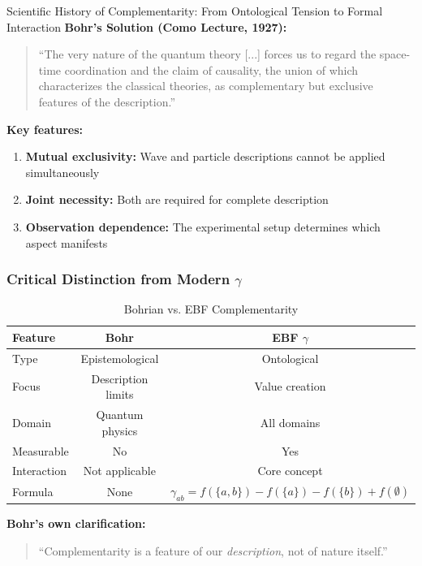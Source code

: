 \begin{chapter}{Scientific History of Complementarity: From Ontological Tension to Formal Interaction}
\textbf{Bohr's Solution (Como Lecture, 1927):}

\begin{quote}
``The very nature of the quantum theory [...] forces us to regard the space-time coordination and the claim of causality, the union of which characterizes the classical theories, as complementary but exclusive features of the description.''
\end{quote}

\textbf{Key features:}
\begin{enumerate}
    \item \textbf{Mutual exclusivity:} Wave and particle descriptions cannot be applied simultaneously
    \item \textbf{Joint necessity:} Both are required for complete description
    \item \textbf{Observation dependence:} The experimental setup determines which aspect manifests
\end{enumerate}

\subsubsection{Critical Distinction from Modern $\gamma$}

\begin{table}[h]
\centering
\caption{Bohrian vs. EBF Complementarity}
\label{tab:bohr-vs-ebf}
\renewcommand{\arraystretch}{1.3}
\begin{tabular}{@{}lcc@{}}
\toprule
\textbf{Feature} & \textbf{Bohr} & \textbf{EBF $\gamma$} \\
\midrule
Type & Epistemological & Ontological \\
Focus & Description limits & Value creation \\
Domain & Quantum physics & All domains \\
Measurable & No & Yes \\
Interaction & Not applicable & Core concept \\
Formula & None & $\gamma_{ab} = f(\{a,b\}) - f(\{a\}) - f(\{b\}) + f(\emptyset)$ \\
\bottomrule
\end{tabular}
\end{table}

\textbf{Bohr's own clarification:}
\begin{quote}
``Complementarity is a feature of our \textit{description}, not of nature itself.''
\end{quote}


\end{chapter}
